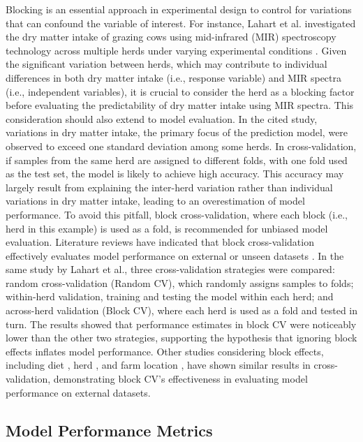 Blocking is an essential approach in experimental design to control for variations that can confound the variable of interest. For instance, Lahart et al. investigated the dry matter intake of grazing cows using mid-infrared (MIR) spectroscopy technology across multiple herds under varying experimental conditions \citep{lahart_predicting_2019}. Given the significant variation between herds, which may contribute to individual differences in both dry matter intake (i.e., response variable) and MIR spectra (i.e., independent variables), it is crucial to consider the herd as a blocking factor before evaluating the predictability of dry matter intake using MIR spectra. This consideration should also extend to model evaluation. In the cited study, variations in dry matter intake, the primary focus of the prediction model, were observed to exceed one standard deviation among some herds. In cross-validation, if samples from the same herd are assigned to different folds, with one fold used as the test set, the model is likely to achieve high accuracy. This accuracy may largely result from explaining the inter-herd variation rather than individual variations in dry matter intake, leading to an overestimation of model performance. To avoid this pitfall, block cross-validation, where each block (i.e., herd in this example) is used as a fold, is recommended for unbiased model evaluation.
Literature reviews have indicated that block cross-validation effectively evaluates model performance on external or unseen datasets \citep{bresolin_infrared_2020}. In the same study by Lahart et al., three cross-validation strategies were compared: random cross-validation (Random CV), which randomly assigns samples to folds; within-herd validation, training and testing the model within each herd; and across-herd validation (Block CV), where each herd is used as a fold and tested in turn. The results showed that performance estimates in block CV were noticeably lower than the other two strategies, supporting the hypothesis that ignoring block effects inflates model performance. Other studies considering block effects, including diet \citep{grelet_potential_2020}, herd \citep{rovere_prediction_2021}, and farm location \citep{adriaens_productive_2020, mota_real-time_2022}, have shown similar results in cross-validation, demonstrating block CV's effectiveness in evaluating model performance on external datasets.

\subsection{Model Performance Metrics}

